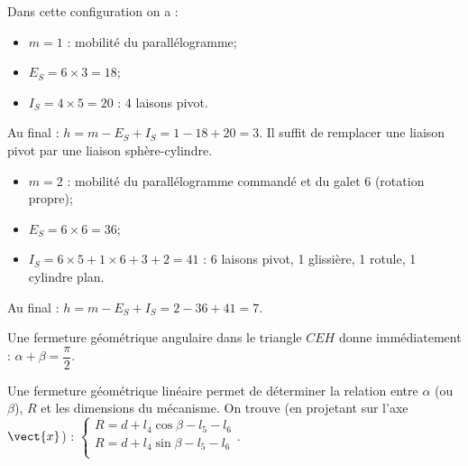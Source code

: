 \ifprof
\begin{corrige}
Dans cette configuration on a : 
\begin{itemize}
\item $m=1$ : mobilité du parallélogramme;
\item $E_S = 6\times 3 = 18$;
\item $I_S = 4\times 5 = 20$ : 4 laisons pivot.
\end{itemize}
Au final : $h=m-E_S+I_S = 1 -18+20 = 3$.
Il suffit de remplacer une liaison pivot par une liaison sphère-cylindre.

\end{corrige}
\else
\fi

\ifprof
\begin{corrige}
\begin{itemize}
\item $m=2$ : mobilité du parallélogramme commandé et du galet 6 (rotation propre);
\item $E_S = 6\times 6 = 36$;
\item $I_S = 6\times 5 + 1\times 6  + 3 + 2=41$ : 6 laisons pivot, 1 glissière, 1 rotule, 1 cylindre plan.
\end{itemize}
Au final : $h=m-E_S+I_S = 2 -36+41 = 7$.

\end{corrige}
\else
\fi


\ifprof
\begin{corrige}
Une fermeture géométrique angulaire dans le triangle $CEH$ donne immédiatement :  $\alpha + \beta =\dfrac{\pi}{2}$.

Une fermeture géométrique linéaire permet de déterminer la relation entre  $\alpha$ (ou $\beta$), $R$ et les dimensions du mécanisme.
On trouve (en projetant sur l’axe $\vect{x}$) :
$\left\{
\begin{array}{l}
R = d + l_4 \cos\beta -l_5 - l_6 \\
R = d + l_4 \sin\beta -l_5 - l_6 \\
\end{array}
\right.
$.

\end{corrige}
\else
\fi

